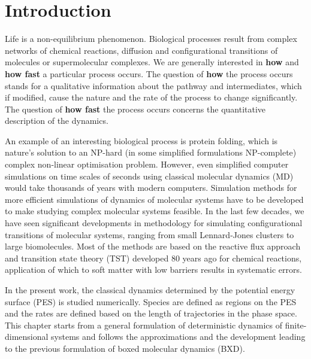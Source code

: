 \chapter{Introduction}

Life is a non-equilibrium phenomenon.
Biological processes result from complex networks of chemical reactions, diffusion and configurational transitions of molecules or supermolecular complexes.
We are generally interested in {\bf how} and {\bf how fast} a particular process occurs.
The question of {\bf how} the process occurs stands for a qualitative information about the pathway and intermediates, which if modified, cause the nature and the rate of the process to change significantly.
The question of {\bf how fast} the process occurs concerns the quantitative description of the dynamics.

An example of an interesting biological process is protein folding, which is nature's solution to an NP-hard\cite{Wales1999} (in some simplified formulations NP-complete\cite{Paterson1996, Crescenzi1998}) complex non-linear optimisation problem.
However, even simplified computer simulations on time scales of seconds using classical molecular dynamics (MD) would take thousands of years with modern computers.
Simulation methods for more efficient simulations of dynamics of molecular systems have to be developed to make studying complex molecular systems feasible.
In the last few decades, we have seen significant developments in methodology for simulating configurational transitions of molecular systems, ranging from small Lennard-Jones clusters to large biomolecules.
Most of the methods are based on the reactive flux approach and transition state theory (TST) developed 80 years ago for chemical reactions, application of which to soft matter with low barriers results in systematic errors.

In the present work, the classical dynamics determined by the potential energy surface (PES)\cite{Wales2003} is studied numerically.
Species are defined as regions on the PES and the rates are defined based on the length of trajectories in the phase space.
This chapter starts from a general formulation of deterministic dynamics of finite-dimensional systems and follows the approximations and the development leading to the previous formulation of boxed molecular dynamics (BXD).\cite{Glowacki2009}


